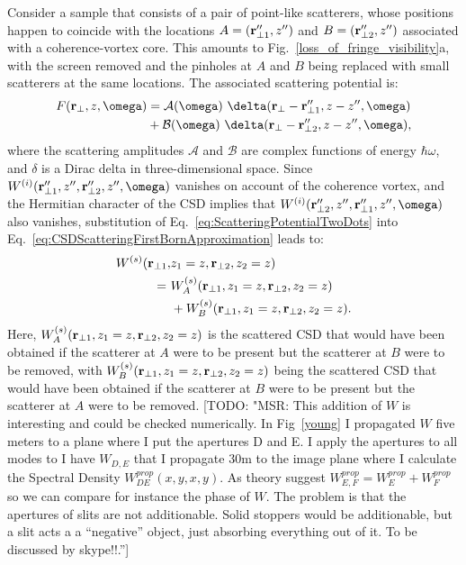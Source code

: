 \documentclass{iucr}              %
\newcommand{\todo}[1]{{\color{red}[TODO: "#1'']}}
\newcommand{\inblue}[1]{{\color{blue}#1}}
\begin{document}
Consider a sample that consists of a pair of point-like scatterers, whose positions happen to coincide with the locations $A=({\bf r}_{\perp 1}'',z'')$ and $B=({\bf r}_{\perp 2}'',z'')$ associated with a coherence-vortex core. This amounts to \inblue{Fig.~\ref{loss_of_fringe_visibility}a}, with the screen removed and the pinholes at $A$ and $B$ being replaced with small scatterers at the same locations.  The associated scattering potential is:
\begin{equation}
\begin{aligned}
F({\bf r}_{\perp},z,\omega) &= \mathcal{A}(\omega)~ \delta({\bf r}_{\perp}-{\bf r}_{\perp 1}'',z-z'',\omega) \\ &+ \mathcal{B}(\omega) ~\delta({\bf r}_{\perp}-{\bf r}_{\perp 2}'',z-z'',\omega),
\label{eq:ScatteringPotentialTwoDots}
\end{aligned}
\end{equation}
where the scattering amplitudes $\mathcal{A}$ and $\mathcal{B}$ are complex functions of energy $\hbar\omega$, and $\delta$ is a Dirac delta in three-dimensional space.   Since $W^{(i)}({\bf r}_{\perp 1}'',z'',{\bf r}_{\perp 2}'',z'',\omega)$ vanishes on account of the coherence vortex, and the Hermitian character of the CSD \cite{mandel_wolf} implies that $W^{(i)}({\bf r}_{\perp 2}'',z'',{\bf r}_{\perp 1}'',z'',\omega)$ also vanishes, substitution of Eq.~\ref{eq:ScatteringPotentialTwoDots} into Eq.~\ref{eq:CSDScatteringFirstBornApproximation} leads to:
\begin{equation}
\begin{aligned}
\label{eq:CSDsforTwoScattersAtCVCore}
W^{(s)} ({\bf r}_{\perp 1}, &z_1=z, {\bf r}_{\perp 2},z_2=z) \\ = ~ &W^{(s)}_A ({\bf r}_{\perp 1}, z_1=z,  {\bf r}_{\perp 2},z_2=z) \\ &+ W^{(s)}_B ({\bf r}_{\perp 1}, z_1=z, {\bf r}_{\perp 2},z_2=z).
\end{aligned}
\end{equation}
Here, $W^{(s)}_A ({\bf r}_{\perp 1}, z_1=z, {\bf r}_{\perp 2},z_2=z)$ is the scattered CSD that would have been obtained if the scatterer at $A$ were to be present but the scatterer at $B$ were to be removed, with $W^{(s)}_B ({\bf r}_{\perp 1}, z_1=z, {\bf r}_{\perp 2},z_2=z)$ being the scattered CSD that would have been obtained if the scatterer at $B$ were to be present but the scatterer at $A$ were to be removed.  
\todo{MSR: This addition of $W$ is interesting and could be checked numerically. In \inblue{Fig~\ref{young}} I propagated $W$ five meters to a plane where I put the apertures D and E. I apply the apertures to all modes to I have $W_{D,E}$ that I propagate 30m to the image plane where I calculate the Spectral Density $W_{DE}^{prop}(x,y,x,y)$. As theory suggest $W_{E,F}^{prop}=W_{E}^{prop}+W_{F}^{prop}$ so we can compare for instance the phase of $W$. The problem is that the apertures of slits are not additionable. Solid stoppers would be additionable, but a slit acts a a ``negative'' object, just absorbing everything out of it. To be discussed by skype!!.}
\end{document}
